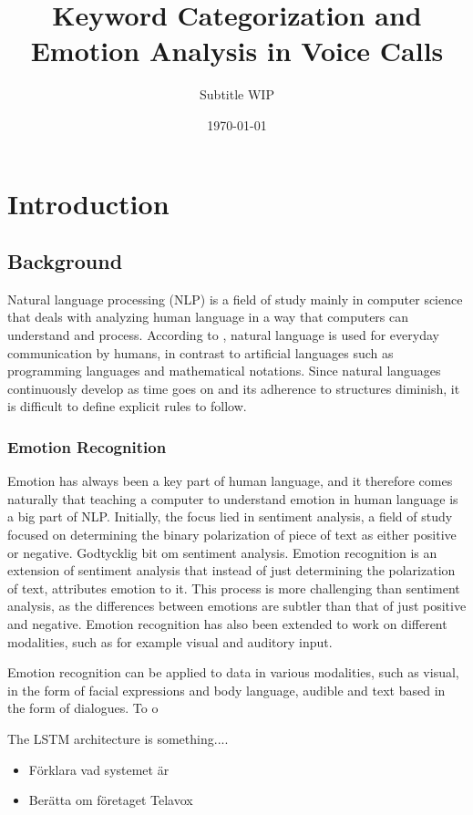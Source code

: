 \documentclass[nofilelist]{cslthse-msc}
\title{Keyword Categorization and Emotion Analysis in Voice Calls}
\subtitle{Subtitle WIP}
\date{\today}
\begin{document}
\renewcommand{\bibname}{References}

\makefrontmatter
\chapter{Introduction}

\section{Background}
Natural language processing (NLP) is a field of study mainly in computer science that deals with analyzing human language in a way that computers can understand and process. According to \citet{ntlk2009}, natural language is used for everyday communication by humans, in contrast to artificial languages such as programming languages and mathematical notations. Since natural languages continuously develop as time goes on and its adherence to structures diminish, it is difficult to define explicit rules to follow. 

\subsection{Emotion Recognition}
Emotion has always been a key part of human language, and it therefore comes naturally that teaching a computer to understand emotion in human language is a big part of NLP. Initially, the focus lied in sentiment analysis, a field of study focused on determining the binary polarization of piece of text as either positive or negative. Godtycklig bit om sentiment analysis. 
Emotion recognition is an extension of sentiment analysis that instead of just determining the polarization of text, attributes emotion to it. This process is more challenging than sentiment analysis, as the differences between emotions are subtler than that of just positive and negative. 
Emotion recognition has also been extended to work on different modalities, such as for example visual and auditory input.


Emotion recognition can be applied to data in various modalities, 
such as visual, in the form of facial expressions and body language, audible and text based in the form of dialogues. To o


The LSTM architecture \citep{ntlk2009} is something....

\begin{itemize}
    \item Förklara vad systemet är
    \item Berätta om företaget Telavox
\end{itemize}
\end{document}
